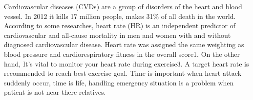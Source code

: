 Cardiovascular diseases (CVDs) are a group of disorders of the heart and blood vessel. In 2012 it kills 17 million people, makes 31\% of all death in the world. 
According to some researches, heart rate (HR) is an independent predictor of cardiovascular and all-cause mortality in men and women with and without diagnosed cardiovascular disease. Heart rate was assigned the same weighting as blood pressure and cardiorespiratory fitness in the overall score1. On the other hand, It's vital to monitor your heart rate during exercise3. A target heart rate is recommended to reach best exercise goal. Time is important when heart attack suddenly occur, time is life, handling emergency situation is a problem when patient is not near there relatives. 
